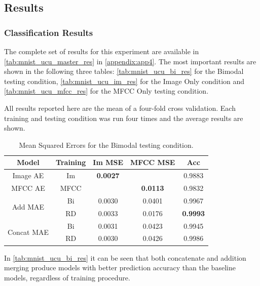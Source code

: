 \begin{table}
	\end{table}




\subsection{Results}

\subsubsection{Classification Results}
The complete set of results for this experiment are available in \autoref{tab:mnist_ucu_master_res} in \autoref{appendix:app4}. The most important results are shown in the following three tables: \autoref{tab:mnist_ucu_bi_res} for the Bimodal testing condition, \autoref{tab:mnist_ucu_im_res} for the Image Only condition and \autoref{tab:mnist_ucu_mfcc_res} for the MFCC Only testing condition. 

All results reported here are the mean of a four-fold cross validation. Each training and testing condition was run four times and the average results are shown.


\begin{table}[h]
	\centering
		\begin{tabular}{|c|c|c|c|c|}
		\hline
		Model & Training & Im MSE & MFCC MSE &  Acc \\ \hline
				Image AE & Im & 	\textbf{0.0027}	&	       			& 	0.9883			\\ \hline		
				MFCC AE & MFCC & 		    		& 	\textbf{0.0113} &	0.9832			\\ \hline		
\multirow{2}{*}{Add MAE} & Bi & 	0.0030			&	0.0401			&	0.9967			\\ \cline{2-5}
						  & RD &	0.0033			&	0.0176			&	\textbf{0.9993}	\\ \hline	
		
\multirow{2}{*}{Concat MAE} & Bi & 0.0031			&	0.0423			&	0.9945			\\ \cline{2-5}		
							 & RD & 0.0030			&	0.0426			&	0.9986			\\ \hline
		\end{tabular}
		\caption{Mean Squared Errors for the Bimodal testing condition.}
		\label{tab:mnist_ucu_bi_res}

\end{table}

In \autoref{tab:mnist_ucu_bi_res} it can be seen that both concatenate and addition merging produce models with better prediction accuracy than the baseline models, regardless of training procedure.

